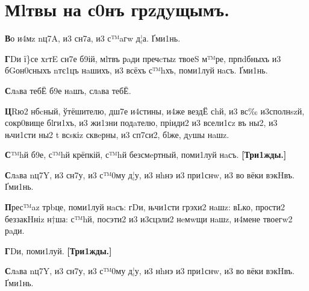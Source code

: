 
\section{Мlтвы на с0нъ грzдyщымъ.}

\textbf{В}о и4мz nц7A, и3 сн7а, и3 с™aгw д¦а. Ґми1нь.

\textbf{Г}Dи ї\}се хrтE сн7е б9ій, мlтвъ рaди пречcтыz твоеS м™ре, прпdбныхъ и3
бGон0сныхъ nтє1цъ нaшихъ, и3 всёхъ с™hхъ, поми1луй нaсъ. Ґми1нь.

\textbf{С}лaва тебЁ б9е нaшъ, слaва тебЁ.

\textbf{Ц}Rю2 нбcный, ўтёшителю, дш7е и4стины, и4же вездЁ сhй, и3 вс‰ и3сполнszй,
сокр0вище бlги1хъ, и3 жи1зни подaтелю, пріиди2 и3 всели1сz въ ны2, и3
њчи1сти ны2 t всsкіz сквeрны, и3 сп7си2, бlже, дyшы нaшz.

\textbf{С}™hй б9е, с™hй крёпкій, с™hй безсмeртный, поми1луй нaсъ.
\textbf{{[}Три1жды.{]}}

\textbf{С}лaва nц7Y, и3 сн7у, и3 с™0му д¦у, и3 нhнэ и3 при1снw, и3 во вёки
вэкHвъ. Ґми1нь.

\textbf{П}рес™az трbце, поми1луй нaсъ: гDи, њчи1сти грэхи2 нaшz: вLко, прости2
беззакHніz н†ша: с™hй, посэти2 и3 и3сцэли2 нeмwщи нaшz, и4мене твоегw2
рaди.


\textbf{Г}Dи, поми1луй. \textbf{{[}Три1жды.{]}}

\textbf{С}лaва nц7Y, и3 сн7у, и3 с™0му д¦у, и3 нhнэ и3 при1снw, и3 во вёки
вэкHвъ. Ґми1нь.

